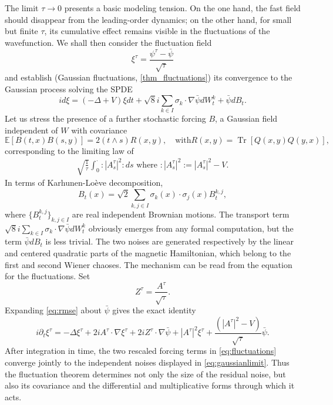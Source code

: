 \documentclass[a4paper,10pt]{amsart}
\DeclareMathOperator{\trace}{Tr}
\theoremstyle{remark}
\numberwithin{equation}{section}
\begin{document}
The limit $\tau\to0$ presents a basic modeling tension. On the one hand, the fast field should disappear from the leading-order dynamics; on the other hand, for small but finite $\tau$, its cumulative effect remains visible in the fluctuations of the wavefunction. We shall then consider the fluctuation field
\begin{equation}
\xi^{\tau}=\frac{\psi^{\tau}-\bar{\psi}}{\sqrt{\tau}}%
\label{def:fluctuations1}%
\end{equation}
and establish (Gaussian fluctuations, \autoref{thm_fluctuations}) its
convergence to the Gaussian process solving the SPDE
\begin{equation*}
id\xi=\left(  -\Delta+V\right)  \xi dt+\sqrt{8}i\sum_{k\in I}\sigma_{k}%
\cdot\nabla\bar{\psi}dW_{t}^{k}+\bar{\psi}dB_{t}.\tag{GFSE}\label{eq:gaussianlimit}%
\end{equation*}
Let us stress the presence of a further stochastic forcing $B$, a Gaussian field independent of $W$ with covariance
\begin{equation}
\mathbb{E}\left[  B(t,x)B(s,y)\right]  =2(t\wedge s)R(x,y),\quad\text{with
}R(x,y)=\trace\left[  Q(x,y)Q(y,x)\right]  ,\label{second_covariance}%
\end{equation}
corresponding to the limiting law of 
\begin{align*}
 \sqrt{\frac{1}{\tau}}%
\int_0^{\cdot}:\mathrel{|A^\tau_s|^2}:ds \,\,  \text{where}\,\,       :\mathrel{|A^\tau_s|^2}:=|A^{\tau}_s|^{2}-V.
\end{align*}
In terms of Karhunen-Lo\`{e}ve decomposition,
\begin{equation*}
    B_{t}(x)=\sqrt{2}\sum_{k,j\in I}\sigma_{k}(x)\cdot\sigma_{j}(x)B_{t}^{k,j},
\end{equation*}
where $\{B_{t}^{k,j}\}_{k,j\in I}$ are real independent Brownian motions. The transport term $\sqrt{8}i\sum_{k\in I}\sigma_{k}\cdot\nabla\bar{\psi}%
dW_{t}^{k}$ obviously emerges from any formal computation, but the term $\bar{\psi}dB_{t}$ is less trivial. The two noises are
generated respectively by the linear and centered quadratic parts of the magnetic Hamiltonian, which belong to the first and second Wiener chaoses. The mechanism can be read from the equation for the fluctuations. Set
\begin{equation}\label{eq:WNapprox1}
    Z^{\tau}=\frac{A^{\tau}}{\sqrt{\tau}}.
\end{equation}
Expanding \eqref{eq:rmse} about $\bar\psi$ gives the exact identity
\begin{equation}\label{eq:fluctuations}
    i\partial_t\xi^{\tau}=-\Delta\xi^{\tau}+ 2iA^{\tau}\cdot\nabla \xi^{\tau}+ 2iZ^{\tau}\cdot\nabla \bar{\psi}+|A^\tau|^2\xi^{\tau}+\frac{\left(|A^\tau|^2-V\right)}{\sqrt{\tau}}\bar{\psi}.
\end{equation}
After integration in time, the two rescaled forcing terms in
\eqref{eq:fluctuations} converge jointly to the independent noises displayed in \eqref{eq:gaussianlimit}.  Thus the fluctuation theorem determines not only the size of the residual noise, but also its covariance and the differential and multiplicative forms through which it acts.
\end{document}
